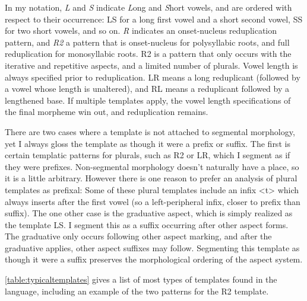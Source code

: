 In my notation, \textit{L} and \textit{S} indicate \textit{L}ong and \textit{S}hort vowels, and are ordered with respect to their occurrence: LS for a long first vowel and a short second vowel, SS for two short vowels, and so on. \textit{R} indicates an onset-nucleus reduplication pattern, and \textit{R2} a pattern that is onset-nucleus for polysyllabic roots, and full reduplication for monosyllabic roots. R2 is a pattern that only occurs with the iterative and repetitive aspects, and a limited number of plurals. Vowel length is always specified prior to reduplication. LR means a long reduplicant (followed by a vowel whose length is unaltered), and RL means a reduplicant followed by a lengthened base. If multiple templates apply, the vowel length specifications of the final morpheme win out, and reduplication remains.

There are two cases where a template is not attached to segmental morphology, yet I always gloss the template as though it were a prefix or suffix. The first is certain templatic patterns for plurals, such as R2 or LR, which I segment as if they were prefixes. Non-segmental morphology doesn't naturally have a place, so it is a little arbitrary. However there is one reason to prefer an analysis of plural templates as prefixal: Some of these plural templates include an infix <t> which always inserts after the first vowel (so a left-peripheral infix, closer to prefix than suffix). The one other case is the graduative aspect, which is simply realized as the template LS. I segment this as a suffix occurring after other aspect forms. The graduative only occurs following other aspect marking, and after the graduative applies, other aspect suffixes may follow. Segmenting this template as though it were a suffix preserves the morphological ordering of the aspect system.

\cref{table:typicaltemplates} gives a list of most types of templates found in the language, including an example of the two patterns for the R2 template.

